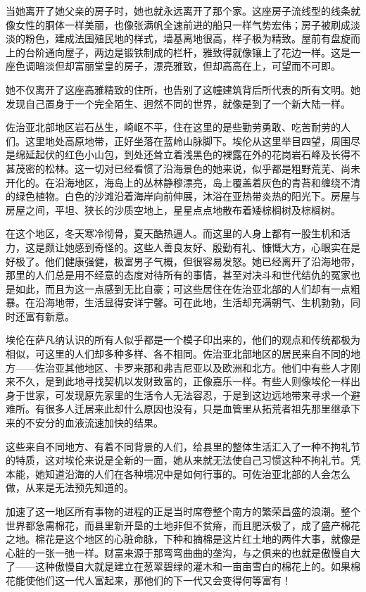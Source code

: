 \par 当她离开了她父亲的房子时，她也就永远离开了那个家。这座房子流线型的线条就像女性的胴体一样美丽，也像张满帆全速前进的船只一样气势宏伟；房子被刷成淡淡的粉色，建成法国殖民地的样式，墙基离地很高，样子极为精致。屋前有盘旋而上的台阶通向屋子，两边是锻铁制成的栏杆，雅致得就像镶上了花边一样。这是一座色调暗淡但却富丽堂皇的房子，漂亮雅致，但却高高在上，可望而不可即。
\par 她不仅离开了这座高雅精致的住所，也告别了这幢建筑背后所代表的所有文明。她发现自己置身于一个完全陌生、迥然不同的世界，就像是到了一个新大陆一样。
\par 佐治亚北部地区岩石丛生，崎岖不平，住在这里的是些勤劳勇敢、吃苦耐劳的人们。这里地处高原地带，正好坐落在蓝岭山脉脚下。埃伦从这里举目四望，周围尽是绵延起伏的红色小山包，到处还耸立着浅黑色的裸露在外的花岗岩石峰及长得不甚茂密的松林。这一切对已经看惯了沿海景色的她来说，似乎都是粗野荒芜、尚未开化的。在沿海地区，海岛上的丛林静穆漂亮，岛上覆盖着灰色的青苔和缠绕不清的绿色植物。白色的沙滩沿着海岸向前伸展，沐浴在亚热带炎热的阳光下。房屋与房屋之间，平坦、狭长的沙质空地上，星星点点地散布着矮棕榈树及棕榈树。
\par 在这个地区，冬天寒冷彻骨，夏天酷热逼人。而这里的人身上都有一股生机和活力，这是颇让她感到奇怪的。这些人善良友好、殷勤有礼、慷慨大方，心眼实在是好极了。他们健康强健，极富男子气概，但很容易发怒。她已经离开了沿海地带，那里的人们总是用不经意的态度对待所有的事情，甚至对决斗和世代结仇的冤家也是如此，而且为这一点感到无比自豪；可这些居住在佐治亚北部的人们却有一点粗暴。在沿海地带，生活显得安详宁馨。可在此地，生活却充满朝气、生机勃勃，同时还富有新意。
\par 埃伦在萨凡纳认识的所有人似乎都是一个模子印出来的，他们的观点和传统都极为相似，可这里的人们却多种多样、各不相同。佐治亚北部地区的居民来自不同的地方——佐治亚其他地区、卡罗来那和弗吉尼亚以及欧洲和北方。他们中有些人才刚来不久，是到此地寻找契机以发财致富的，正像嘉乐一样。有些人则像埃伦一样出身于世家，可发现原先家里的生活令人无法容忍，于是到这边远地带来寻求一个避难所。有很多人迁居来此却什么原因也没有，只是血管里从拓荒者祖先那里继承下来的不安分的血液流速加快的结果。
\par 这些来自不同地方、有着不同背景的人们，给县里的整体生活汇入了一种不拘礼节的特质，这对埃伦来说是全新的一面，她从来就无法使自己习惯这种不拘礼节。凭本能，她知道沿海的人们在各种境况中是如何行事的。可佐治亚北部的人会怎么做，从来是无法预先知道的。
\par 加速了这一地区所有事物的进程的正是当时席卷整个南方的繁荣昌盛的浪潮。整个世界都急需棉花，而县里新开垦的土地非但不贫瘠，而且肥沃极了，成了盛产棉花之地。棉花是这个地区的心脏命脉，下种和摘棉是这片红土地的两件大事，就像是心脏的一张一弛一样。财富来源于那弯弯曲曲的垄沟，与之俱来的也就是傲慢自大了——这种傲慢自大就是建立在葱翠碧绿的灌木和一亩亩雪白的棉花上的。如果棉花能使他们这一代人富起来，那他们的下一代又会变得何等富有！
